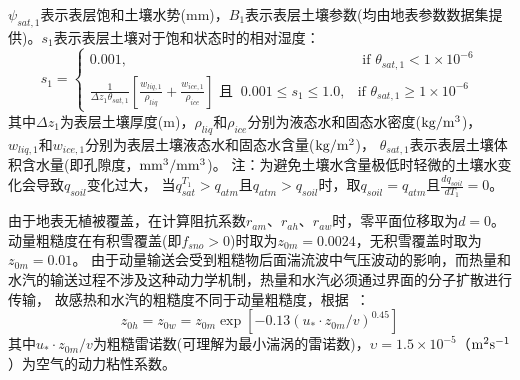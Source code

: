 $\psi_{sat,1}$表示表层饱和土壤水势(mm)，$B_1$表示表层土壤\citep{clapp1978empirical}参数(均由地表参数数据集提供)。$s_1$表示表层土壤对于饱和状态时的相对湿度：
\begin{equation}
s_{1}= \begin{cases}
   0.001, & \text { if } \theta_{sat, 1}<1 \times 10^{-6} \\ 
   \frac{1}{\Delta z_{1} \theta_{sat, 1}}\left[\frac{w_{liq, 1}}{\rho_{liq}}+\frac{w_{ice, 1}}{\rho_{ice}}\right]  \text{ 且  }\  0.001 \leq s_{1} \leq 1.0, &\text {if } \theta_{sat, 1} \geq 1 \times 10^{-6}
   \end{cases}
\end{equation}
其中$\Delta z_{1}$为表层土壤厚度(m)，$\rho_{liq}$和$\rho_{ice}$分别为液态水和固态水密度($\rm kg/m^3$)，
$w_{liq,1}$和$w_{ice,1}$分别为表层土壤液态水和固态水含量($\rm kg/m^2$)，
$\theta_{sat,1}$表示表层土壤体积含水量(即孔隙度，$\rm mm^3/mm^3$)。
注：为避免土壤水含量极低时轻微的土壤水变化会导致$q_{soil}$变化过大，
当$q_{sat}^{T_1}>q_{atm}$且$q_{atm}>q_{soil}$时，取$q_{soil} = q_{atm}$且$\frac{dq_{soil}}{dT_1} = 0$。


由于地表无植被覆盖，在计算阻抗系数$r_{am}$、$r_{ah}$、$r_{aw}$时，零平面位移取为$d=0$。
动量粗糙度在有积雪覆盖(即$f_{sno}>0$)时取为$z_{0m}=0.0024$，无积雪覆盖时取为$z_{0m}=0.01$。
由于动量输送会受到粗糙物后面湍流波中气压波动的影响，而热量和水汽的输送过程不涉及这种动力学机制，热量和水汽必须通过界面的分子扩散进行传输，
故感热和水汽的粗糙度不同于动量粗糙度，根据~\citet{zeng1998effect}：
\begin{equation}\label{z0hw}
z_{0 h} = z_{0 w} = z_{0 m} \exp \left[-0.13\left(u_{*} \cdot z_{0 m} / v\right)^{0.45}\right]
\end{equation}
其中$u_{*} \cdot z_{0 m} / v$为粗糙雷诺数(可理解为最小湍涡的雷诺数)，$\upsilon=1.5\times{10}^{-5}$（$\rm m^2s^{-1}$）为空气的动力粘性系数。


